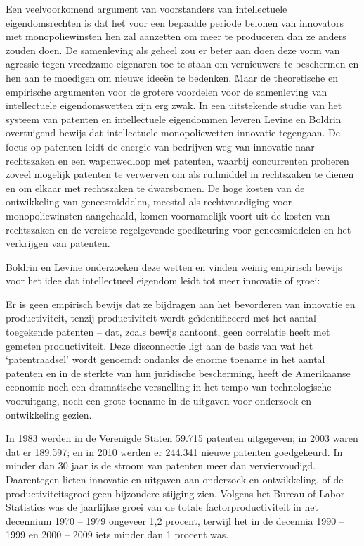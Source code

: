 Een veelvoorkomend argument van voorstanders van intellectuele eigendomsrechten is dat het voor een bepaalde periode belonen van innovators met monopoliewinsten hen zal aanzetten om meer te produceren dan ze anders zouden doen. De samenleving als geheel zou er beter aan doen deze vorm van agressie tegen vreedzame eigenaren toe te staan om vernieuwers te beschermen en hen aan te moedigen om nieuwe ideeën te bedenken. Maar de theoretische en empirische argumenten voor de grotere voordelen voor de samenleving van intellectuele eigendomswetten zijn erg zwak. In een uitstekende studie van het systeem van patenten en intellectuele eigendommen leveren Levine en Boldrin overtuigend bewijs dat intellectuele monopoliewetten innovatie tegengaan. De focus op patenten leidt de energie van bedrijven weg van innovatie naar rechtszaken en een wapenwedloop met patenten, waarbij concurrenten proberen zoveel mogelijk patenten te verwerven om als ruilmiddel in rechtszaken te dienen en om elkaar met rechtszaken te dwarsbomen. De hoge kosten van de ontwikkeling van geneesmiddelen, meestal als rechtvaardiging voor monopoliewinsten aangehaald, komen voornamelijk voort uit de kosten van rechtszaken en de vereiste regelgevende goedkeuring voor geneesmiddelen en het verkrijgen van patenten.

Boldrin en Levine onderzoeken deze wetten en vinden weinig empirisch bewijs voor het idee dat intellectueel eigendom leidt tot meer innovatie of groei:

\begin{blockquotebox}
    Er is geen empirisch bewijs dat ze bijdragen aan het bevorderen van innovatie en productiviteit, tenzij productiviteit wordt geïdentificeerd met het aantal toegekende patenten -- dat, zoals bewijs aantoont, geen correlatie heeft met gemeten productiviteit. Deze disconnectie ligt aan de basis van wat het `patentraadsel' wordt genoemd: ondanks de enorme toename in het aantal patenten en in de sterkte van hun juridische bescherming, heeft de Amerikaanse economie noch een dramatische versnelling in het tempo van technologische vooruitgang, noch een grote toename in de uitgaven voor onderzoek en ontwikkeling gezien.
    \par\vspace{1em}\noindent
    In 1983 werden in de Verenigde Staten 59.715 patenten uitgegeven; in 2003 waren dat er 189.597; en in 2010 werden er 244.341 nieuwe patenten goedgekeurd. In minder dan 30 jaar is de stroom van patenten meer dan verviervoudigd. Daarentegen lieten innovatie en uitgaven aan onderzoek en ontwikkeling, of de productiviteitsgroei geen bijzondere stijging zien. Volgens het Bureau of Labor Statistics was de jaarlijkse groei van de totale factorproductiviteit in het decennium 1970 -- 1979 ongeveer 1,2 procent, terwijl het in de decennia 1990 -- 1999 en 2000 -- 2009 iets minder dan 1 procent was.\footnotemark
\end{blockquotebox}

